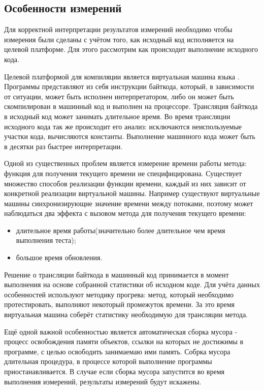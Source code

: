 \subsection{Особенности измерений}
Для корректной интерпретации результатов измерений необходимо чтобы измерения были сделаны с учётом того, как исходный код исполняется на целевой платформе. Для этого рассмотрим как происходит выполнение исходного кода.

Целевой платформой для компиляции является виртуальная машина языка . Программы представляют из себя инструкции байткода, который, в зависимости от ситуации, может быть исполнен интерпретатором, либо он может быть скомпилирован в машинный код и выполнен на процессоре. Трансляция байткода в исходный код может занимать длительное время. Во время трансляции исходного кода так же происходит его анализ: исключаются неиспользуемые участки кода, вычисляются константы. Выполнение машинного кода может быть в десятки раз быстрее интерпретации.

Одной из существенных проблем является измерение времени работы метода: функция для получения текущего времени не специфицирована. Существует множество способов реализации функции времени, каждый из них зависит от конкретной реализации виртуальной машины. Например существуют виртуальные машины синхронизирующие значение времени между потоками, поэтому может наблюдаться два эффекта с вызовом метода для получения текущего времени:
\begin{itemize}
  \item длительное время работы(значительно более длительное чем время выполнения теста);
  \item большое время обновления.
\end{itemize}

Решение о трансляции байткода в машинный код принимается в момент выполнения на основе собранной статистики об исходном коде. Для учёта данных особенностей используют методику прогрева: метод, который необходимо протестировать, выполняют некоторый промежуток времени. За это время виртуальная машина соберёт статистику необходимую для трансляции метода.

Ещё одной важной особенностью является автоматическая сборка мусора - процесс освобождения памяти объектов, ссылки на которых не достижимы в программе, с целью освободить занимаемаю ими память. Собрка мусора длительная процедура, в процессе которой выполнение программы приостанавливается. В случае если сборка мусора запустится во время выполнения измерений, результаты измерений будут искажены.

